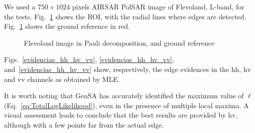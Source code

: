 \documentclass[journal]{IEEEtran}
\begin{document}
We used a $750\times 1024$ pixels AIRSAR PolSAR image of Flevoland, L-band, for the tests. 
Fig.~\ref{roi_gt} shows the ROI, with the radial lines where edges are detected. 
Fig.~\ref{roi_gt} shows the ground reference in red.  

\begin{figure}[hbt]
   \centering
    \caption{Flevoland image in Pauli decomposition, and ground reference}
    \label{roi_gt}
\end{figure}

Figs.~\ref{evidencias_hh_hv_vv}, \ref{evidencias_hh_hv_vv}, and~\ref{evidencias_hh_hv_vv} show, respectively, the edge evidences in the $\text{hh}$, $\text{hv}$ and $\text{vv}$ channels as obtained by MLE.

It is worth noting that GenSA has accurately identified the maximum value of $\ell$ (Eq.~\eqref{eq:TotalLogLikelihood}), even in the presence of multiple local maxima. 
A visual assessment leads to conclude that the best results are provided by $\text{hv}$, although with a few points far from the actual edge.
\end{document}
